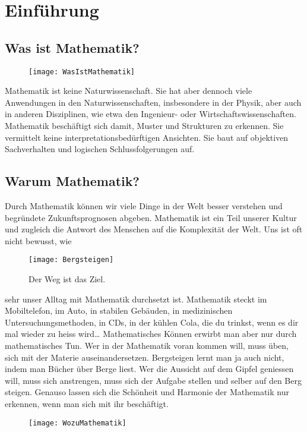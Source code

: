 \chapter{Einführung}

\section{Was ist Mathematik?}
\begin{wrapfigure}{r}{0.45\textwidth}
    \vspace{-.8cm}
	\begin{center}
		\texttt{[image: WasIstMathematik]}
	\end{center}
\end{wrapfigure}
Mathematik ist keine Naturwissenschaft. Sie hat aber dennoch viele Anwendungen in den Naturwissenschaften, insbesondere in der Physik, aber auch in anderen Disziplinen, wie etwa den Ingenieur- oder Wirtschaftswissenschaften.
Mathematik beschäftigt sich damit, Muster und Strukturen zu erkennen. 
Sie vermittelt keine interpretationsbedürftigen Ansichten.
Sie baut auf objektiven Sachverhalten und logischen Schlussfolgerungen auf.\par

\section{Warum Mathematik?}
Durch Mathematik können wir viele Dinge in der Welt besser verstehen und begründete Zukunftsprognosen abgeben.
Mathematik ist ein Teil unserer Kultur und zugleich die Antwort des Menschen auf die Komplexität der Welt.
Uns ist oft nicht bewusst, wie
\begin{wrapfigure}{l}{0.5\textwidth}
    \vspace{-.4cm}
	\begin{center}
		\texttt{[image: Bergsteigen]}
	\end{center}
	\caption{Der Weg ist das Ziel.}
\end{wrapfigure}
sehr unser Alltag mit Mathematik durchsetzt ist.
Mathematik steckt im Mobiltelefon, im Auto, in stabilen Gebäuden, in medizinischen Untersuchungsmethoden, in CDs, in der kühlen Cola, die du trinkst, wenn es dir mal wieder zu heiss wird\ldots
Mathematisches Können erwirbt man aber nur durch mathematisches Tun. Wer in der Mathematik voran kommen will, muss üben, sich mit der Materie auseinandersetzen. Bergsteigen lernt man ja auch nicht, indem man Bücher über Berge liest.
Wer die Aussicht auf dem Gipfel geniessen will, muss sich anstrengen, muss sich der Aufgabe stellen und selber auf den Berg steigen.
Genauso lassen sich die Schönheit und Harmonie der Mathematik nur erkennen, wenn man sich mit ihr beschäftigt.

\begin{figure}
\texttt{[image: WozuMathematik]}
\end{figure}
\thispagestyle{empty}
